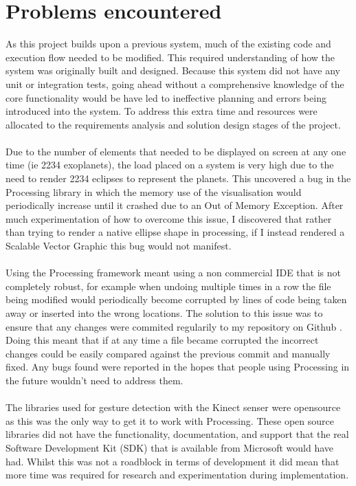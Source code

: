 \section{Problems encountered}

As this project builds upon a previous system, much of the existing code and
execution flow needed to be modified. This required understanding of how the
system was originally built and designed. Because this system did not have any
unit or integration tests, going ahead without a comprehensive knowledge of the
core functionality would be have led to ineffective planning and errors being
introduced into the system. To address this extra time and resources were
allocated to the requirements analysis and solution design stages of the
project.
\\\\
Due to the number of elements that needed to be displayed on screen at any one
time (ie 2234 exoplanets), the load placed on a system is very high due to the
need to render 2234 eclipses to represent the planets. This uncovered a bug in
the Processing library in which the memory use of the visualisation would
periodically increase until it crashed due to an Out of Memory Exception. After
much experimentation of how to overcome this issue, I discovered that rather
than trying to render a native ellipse shape in processing, if I instead
rendered
a Scalable Vector Graphic this bug would not manifest. 
\\\\
Using the Processing framework meant using a non commercial IDE that is not
completely robust, for example when undoing multiple times in a row the file
being
modified would periodically become corrupted by lines of code being taken away
or inserted into the wrong locations. The solution to this issue was to ensure
that any changes were commited regularily to my repository on Github
\cite{github}. Doing this meant that if at any time a file became corrupted the
incorrect changes could be easily compared against the previous commit and
manually fixed. Any bugs found were reported in
the hopes that people using Processing in the future wouldn't need to address
them.
\\\\
The libraries used for gesture detection with the Kinect senser were opensource
as this was the only way to get it to work with Processing. These open source
libraries did not have the functionality, documentation, and support that the
real Software Development Kit (SDK) that is available from Microsoft would have
had. Whilst this was not a roadblock in terms of development it did mean that
more time was required for research and experimentation during implementation.
\\\\

